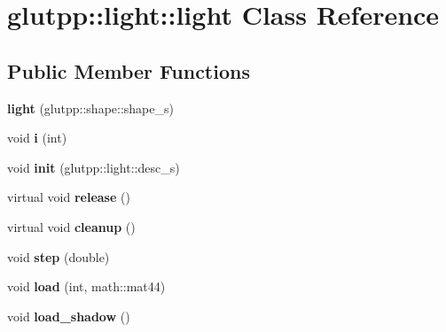 \hypertarget{classglutpp_1_1light_1_1light}{\section{glutpp\-:\-:light\-:\-:light \-Class \-Reference}
\label{classglutpp_1_1light_1_1light}
}
\subsection*{\-Public \-Member \-Functions}
\begin{DoxyCompactItemize}
\item 
\hypertarget{classglutpp_1_1light_1_1light_a0ca55171134122bde88842bf7ec2fcce}{{\bfseries light} (glutpp\-::shape\-::shape\-\_\-s)}\label{classglutpp_1_1light_1_1light_a0ca55171134122bde88842bf7ec2fcce}

\item 
\hypertarget{classglutpp_1_1light_1_1light_afb6aab641a407977f43393f1145e9ae9}{void {\bfseries i} (int)}\label{classglutpp_1_1light_1_1light_afb6aab641a407977f43393f1145e9ae9}

\item 
\hypertarget{classglutpp_1_1light_1_1light_ac7325e859b66652b5807d0793af509f3}{void {\bfseries init} (glutpp\-::light\-::desc\-\_\-s)}\label{classglutpp_1_1light_1_1light_ac7325e859b66652b5807d0793af509f3}

\item 
\hypertarget{classglutpp_1_1light_1_1light_a84dc2f6887e3423c6083c5c7117e5705}{virtual void {\bfseries release} ()}\label{classglutpp_1_1light_1_1light_a84dc2f6887e3423c6083c5c7117e5705}

\item 
\hypertarget{classglutpp_1_1light_1_1light_a2b84a85ec45ca3c1ce026b66fb0ae310}{virtual void {\bfseries cleanup} ()}\label{classglutpp_1_1light_1_1light_a2b84a85ec45ca3c1ce026b66fb0ae310}

\item 
\hypertarget{classglutpp_1_1light_1_1light_ad27fbd7b4fe66e9137ca3b465042c33f}{void {\bfseries step} (double)}\label{classglutpp_1_1light_1_1light_ad27fbd7b4fe66e9137ca3b465042c33f}

\item 
\hypertarget{classglutpp_1_1light_1_1light_a6146d2771b4b3f2df5dd92c04fa9c9f8}{void {\bfseries load} (int, math\-::mat44)}\label{classglutpp_1_1light_1_1light_a6146d2771b4b3f2df5dd92c04fa9c9f8}

\item 
\hypertarget{classglutpp_1_1light_1_1light_aa37d836e3b1ea0fbd44023482069e0b5}{void {\bfseries load\-\_\-shadow} ()}\label{classglutpp_1_1light_1_1light_aa37d836e3b1ea0fbd44023482069e0b5}


\end{DoxyCompactItemize}
